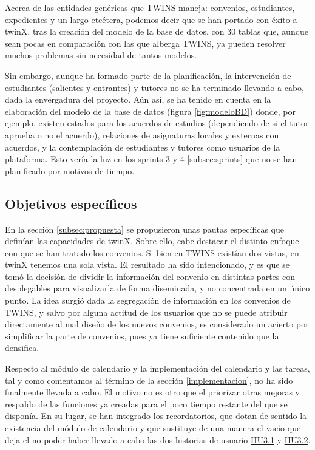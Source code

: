 Acerca de las entidades genéricas que TWINS maneja: convenios, estudiantes, expedientes y un largo etcétera, podemos decir que se han portado con éxito a twinX, tras la creación del modelo de la base de datos, con 30 tablas que, aunque sean pocas en comparación con las que alberga TWINS, ya pueden resolver muchos problemas sin necesidad de tantos modelos. 

Sin embargo, aunque ha formado parte de la planificación, la intervención de estudiantes (salientes y entrantes) y tutores no se ha terminado llevando a cabo, dada la envergadura del proyecto. Aún así, se ha tenido en cuenta en la elaboración del modelo de la base de datos (figura  \ref{fig:modeloBD}) donde, por ejemplo, existen estados para los acuerdos de estudios (dependiendo de si el tutor aprueba o no el acuerdo), relaciones de asignaturas locales y externas con acuerdos, y la contemplación de estudiantes y tutores como usuarios de la plataforma. Esto vería la luz en los sprints 3 y 4 \ref{subsec:sprints} que no se han planificado por motivos de tiempo.

\subsection{Objetivos específicos}

En la sección \ref{subsec:propuesta} se propusieron unas pautas específicas que definían las capacidades de twinX. Sobre ello, cabe destacar el distinto enfoque con que se han tratado los convenios. Si bien en TWINS existían dos vistas, en twinX tenemos una sola vista. El resultado ha sido intencionado, y es que se tomó la decisión de dividir la información del convenio en distintas partes con desplegables para visualizarla de forma diseminada, y no concentrada en un único punto. La idea surgió dada la segregación de información en los convenios de TWINS, y salvo por alguna actitud de los usuarios que no se puede atribuir directamente al mal diseño de los nuevos convenios, es considerado un acierto por simplificar la parte de convenios, pues ya tiene suficiente contenido que la densifica.

Respecto al módulo de calendario y la implementación del calendario y las tareas, tal y como comentamos al término de la sección \ref{implementacion}, no ha sido finalmente llevada a cabo. El motivo no es otro que el priorizar otras mejoras y respaldo de las funciones ya creadas para el poco tiempo restante del que se disponía. En su lugar, se han integrado los recordatorios, que dotan de sentido la existencia del módulo de calendario y que sustituye de una manera el vacío que deja el no poder haber llevado a cabo las dos historias de usuario \hyperref[tab:HU3.1]{HU3.1} y \hyperref[tab:HU3.2]{HU3.2}.

